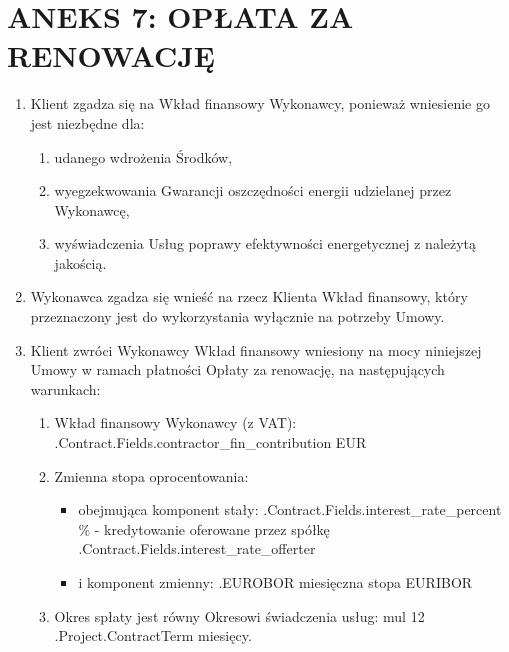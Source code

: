 \section{ANEKS 7: OPŁATA ZA RENOWACJĘ}

\begin{enumerate}[label=\arabic*.]
	\item Klient zgadza się na Wkład finansowy Wykonawcy, ponieważ wniesienie go jest niezbędne dla:
	\begin{enumerate}
		\item udanego wdrożenia Środków,
		\item wyegzekwowania Gwarancji oszczędności energii udzielanej przez Wykonawcę,
		\item wyświadczenia Usług poprawy efektywności energetycznej z należytą jakością.
	\end{enumerate}

	\item Wykonawca zgadza się wnieść na rzecz Klienta Wkład finansowy, który przeznaczony jest do wykorzystania wyłącznie na potrzeby Umowy.
	\item Klient zwróci Wykonawcy Wkład finansowy wniesiony na mocy niniejszej Umowy w ramach płatności Opłaty za renowację, na następujących warunkach:
	\begin{enumerate}
		\item Wkład finansowy Wykonawcy (z VAT): \iffalse input fields.contractor_fin_contribution value="{{.Contract.Fields.contractor_fin_contribution}}" \fi {{.Contract.Fields.contractor_fin_contribution}} EUR
		\item Zmienna stopa oprocentowania:
			\begin{itemize}
				\item obejmująca komponent stały: \iffalse input fields.interest_rate_percent value="{{.Contract.Fields.interest_rate_percent}}" \fi {{.Contract.Fields.interest_rate_percent}} \% {-} kredytowanie oferowane przez spółkę \iffalse input fields.interest_rate_offerter value="{{.Contract.Fields.interest_rate_offerter}}" \fi {{.Contract.Fields.interest_rate_offerter}}
				\item i komponent zmienny: {{.EUROBOR}} miesięczna stopa EURIBOR
			\end{itemize}
		\item Okres spłaty jest równy Okresowi świadczenia usług: {{mul 12 .Project.ContractTerm}} miesięcy.
	\end{enumerate}


\end{enumerate}
